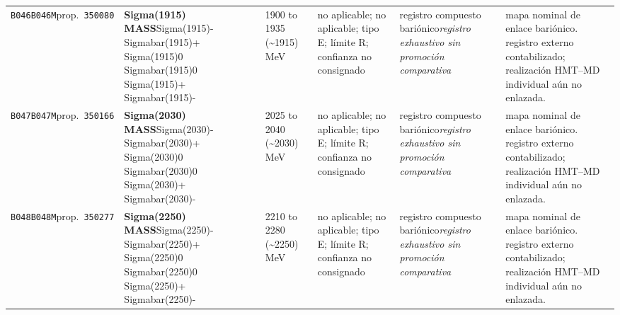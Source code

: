 \begin{landscape}
\begin{longtable}{L{1.85cm}L{4.45cm}L{2.35cm}L{4.05cm}L{3.35cm}L{7.15cm}}
\texttt{B046}\newline \texttt{B046M}\newline prop.\ \texttt{350080} & \textbf{Sigma(1915) MASS}\newline Sigma(1915)- \textbar{}\allowbreak{} Sigmabar(1915)+ \textbar{}\allowbreak{} Sigma(1915)0 \textbar{}\allowbreak{} Sigmabar(1915)0 \textbar{}\allowbreak{} Sigma(1915)+ \textbar{}\allowbreak{} Sigmabar(1915)- & 1900 to 1935 (\textasciitilde{}1915)\,MeV & no aplicable; no aplicable; tipo E; límite R; confianza no consignado & registro compuesto bariónico\newline \emph{registro exhaustivo sin promoción comparativa} & mapa nominal de enlace bariónico. registro externo contabilizado; realización HMT--MD individual aún no enlazada. \\
\texttt{B047}\newline \texttt{B047M}\newline prop.\ \texttt{350166} & \textbf{Sigma(2030) MASS}\newline Sigma(2030)- \textbar{}\allowbreak{} Sigmabar(2030)+ \textbar{}\allowbreak{} Sigma(2030)0 \textbar{}\allowbreak{} Sigmabar(2030)0 \textbar{}\allowbreak{} Sigma(2030)+ \textbar{}\allowbreak{} Sigmabar(2030)- & 2025 to 2040 (\textasciitilde{}2030)\,MeV & no aplicable; no aplicable; tipo E; límite R; confianza no consignado & registro compuesto bariónico\newline \emph{registro exhaustivo sin promoción comparativa} & mapa nominal de enlace bariónico. registro externo contabilizado; realización HMT--MD individual aún no enlazada. \\
\texttt{B048}\newline \texttt{B048M}\newline prop.\ \texttt{350277} & \textbf{Sigma(2250) MASS}\newline Sigma(2250)- \textbar{}\allowbreak{} Sigmabar(2250)+ \textbar{}\allowbreak{} Sigma(2250)0 \textbar{}\allowbreak{} Sigmabar(2250)0 \textbar{}\allowbreak{} Sigma(2250)+ \textbar{}\allowbreak{} Sigmabar(2250)- & 2210 to 2280 (\textasciitilde{}2250)\,MeV & no aplicable; no aplicable; tipo E; límite R; confianza no consignado & registro compuesto bariónico\newline \emph{registro exhaustivo sin promoción comparativa} & mapa nominal de enlace bariónico. registro externo contabilizado; realización HMT--MD individual aún no enlazada. \\

\end{longtable}
\end{landscape}
